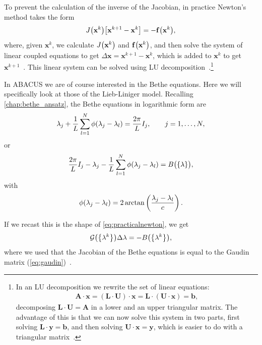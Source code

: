 \documentclass[11pt, a4paper]{report} %
\begin{document}
To prevent the calculation of the inverse of the Jacobian, in practice Newton's method takes the form
\begin{equation}\label{eq:practicalnewton}
  J\qty(\mathbf{x}^k)\qty[\mathbf{x}^{k+1} - \mathbf{x}^k] = - \mathbf{f}\qty(\mathbf{x}^k),
\end{equation}
where, given \(\mathbf{x}^k\), we calculate \(J\qty(\mathbf{x}^k)\) and \( \mathbf{f}\qty(\mathbf{x}^k)\), and then solve the system of linear coupled equations to get \(\Delta\mathbf{x}=\mathbf{x}^{k+1} - \mathbf{x}^k\), which is added to \(\mathbf{x}^k\) to get \(\mathbf{x}^{k+1}\)~\cite{Sueli2003}. 
This linear system can be solved using LU decomposition~\cite{Press2007}.\footnote{In an LU decomposition we rewrite the set of linear equations:
  \begin{align}
    \label{eq:54}
    \mathbf{A}\cdot\mathbf{x} = (\mathbf{L}\cdot\mathbf{U}) \cdot \mathbf{x} =\mathbf{L}\cdot(\mathbf{U} \cdot \mathbf{x}) = \mathbf{b},
  \end{align}
decomposing \(\mathbf{L}\cdot\mathbf{U} = \mathbf{A}\) in a lower and an upper triangular matrix.
The advantage of this is that we can now solve this system in two parts, first solving \(\mathbf{L}\cdot\mathbf{y} = \mathbf{b}\), and then solving \(\mathbf{U}\cdot\mathbf{x} = \mathbf{y}\), which is easier to do with a triangular matrix~\cite{Press2007}.
}

In ABACUS we are of course interested in the Bethe equations.
Here we will specifically look at those of the Lieb-Liniger model.
Recalling \cref{chap:bethe_ansatz}, the Bethe equations in logarithmic form are 
\begin{align}
  \lambda_j + \frac{1}{L} \sum_{l=1}^N \phi\qty(\lambda_j - \lambda_l) = \frac{2\pi}{L}I_j, \qquad j = 1,\ldots,N,
\end{align}
or
\begin{align}
  \frac{2\pi}{L}I_j - \lambda_j - \frac{1}{L} \sum_{l=1}^N \phi\qty(\lambda_j - \lambda_l) = B\qty\big(\{\lambda\}),
\end{align}
with
\begin{equation}
  \phi\qty(\lambda_j - \lambda_l) = 2\arctan\left(\frac{\lambda_j-\lambda_l}{c}\right).
\end{equation}

If we recast this is the shape of \cref{eq:practicalnewton}, we get
\begin{equation}
  \mathcal{G}\qty(\qty{\lambda^k}) \Delta \lambda = -B\qty(\qty{\lambda^k}),
\end{equation}
where we used that the Jacobian of the Bethe equations is equal to the Gaudin matrix (\cref{eq:gaudin})~\cite{Caux2009}.
\end{document}
